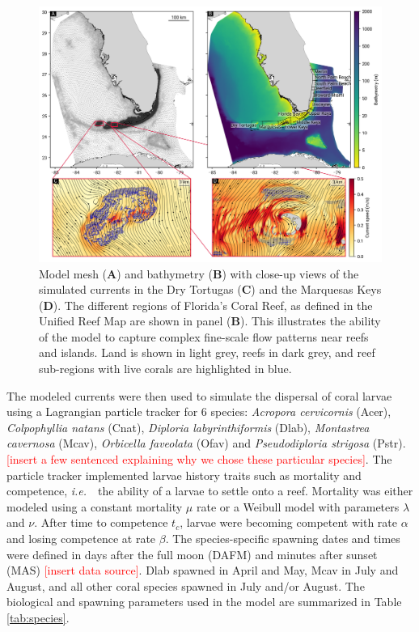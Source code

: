 \documentclass[preprint,12pt,authoryear]{elsarticle}
\newcommand{\ie}{{\it i.e.}\ }
\begin{document}
\begin{figure}
    \centering
    \includegraphics[width=\textwidth]{figures/fig_mesh_tnc.png}
    \caption{Model mesh (\textbf{A}) and bathymetry (\textbf{B}) with close-up views of the simulated currents in the Dry Tortugas (\textbf{C}) and the Marquesas Keys (\textbf{D}). The different regions of Florida's Coral Reef, as defined in the Unified Reef Map are shown in panel (\textbf{B}). This illustrates the ability of the model to capture complex fine-scale flow patterns near reefs and islands. Land is shown in light grey, reefs in dark grey, and reef sub-regions with live corals are highlighted in blue.}
    \label{fig:mesh}
\end{figure}
The modeled currents were then used to simulate the dispersal of coral larvae using a Lagrangian particle tracker for 6 species: \textit{Acropora cervicornis} (Acer), \textit{Colpophyllia natans} (Cnat), \textit{Diploria labyrinthiformis} (Dlab), \textit{Montastrea cavernosa} (Mcav), \textit{Orbicella faveolata} (Ofav) and \textit{Pseudodiploria strigosa} (Pstr). \textcolor{red}{[insert a few sentenced explaining why we chose these particular species]}. The particle tracker implemented larvae history traits such as mortality and competence, \ie~the ability of a larvae to settle onto a reef. Mortality was either modeled using a constant mortality $\mu$ rate or a Weibull model \citep{king2023larval} with parameters $\lambda$ and $\nu$. After time to competence $t_c$, larvae were becoming competent with rate $\alpha$ and losing competence at rate $\beta$. The species-specific spawning dates and times were defined in days after the full moon (DAFM) and minutes after sunset (MAS) \textcolor{red}{[insert data source]}. Dlab spawned in April and May, Mcav in July and August, and all other coral species spawned in July and/or August. The biological and spawning parameters used in the model are summarized in Table \ref{tab:species}.
\end{document}
